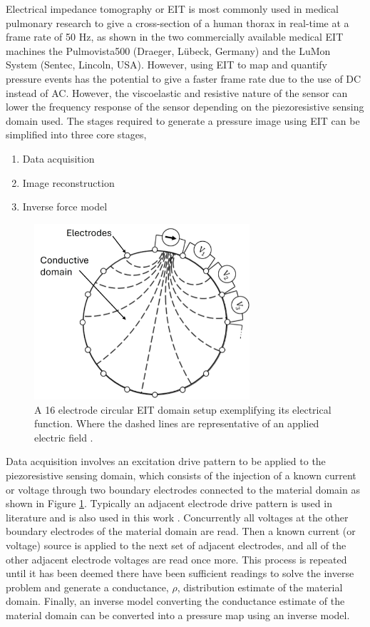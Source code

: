 Electrical impedance tomography or EIT is most commonly used in medical pulmonary research to give a cross-section of a human thorax in real-time at a frame rate of 50 Hz, as shown in the two commercially available medical EIT machines the Pulmovista500 (Draeger, Lübeck, Germany) and the LuMon System (Sentec, Lincoln, USA). However, using EIT to map and quantify pressure events has the potential to give a faster frame rate due to the use of DC instead of AC. However, the viscoelastic and resistive nature of the sensor can lower the frequency response of the sensor depending on the piezoresistive sensing domain used. The stages required to generate a pressure image using EIT can be simplified into three core stages,
\begin{enumerate}
	\item Data acquisition
	\item Image reconstruction
	\item Inverse force model
\end{enumerate} 
\begin{figure}[H]
	\centering
	\includegraphics[width=8cm]{Figures/EIT_diagram_labelled.jpg}
	\vspace{0.3cm}
	\caption{A 16 electrode circular EIT domain setup exemplifying its electrical function. Where the dashed lines are representative of an applied electric field\cite{Ellingham2022} .}
	\label{fig:EIT_diagram}
\end{figure}
Data acquisition involves an excitation drive pattern to be applied to the piezoresistive sensing domain, which consists of the injection of a known current or voltage through two boundary electrodes connected to the material domain as shown in Figure \ref{fig:EIT_diagram}. Typically an adjacent electrode drive pattern is used in literature and is also used in this work\cite{Russo2017} . Concurrently all voltages at the other boundary electrodes of the material domain are read. Then a known current (or voltage) source is applied to the next set of adjacent electrodes, and all of the other adjacent electrode voltages are read once more. This process is repeated until it has been deemed there have been sufficient readings to solve the inverse problem and generate a conductance, $\rho$, distribution estimate of the material domain. Finally, an inverse model converting the conductance estimate of the material domain can be converted into a pressure map using an inverse model.


